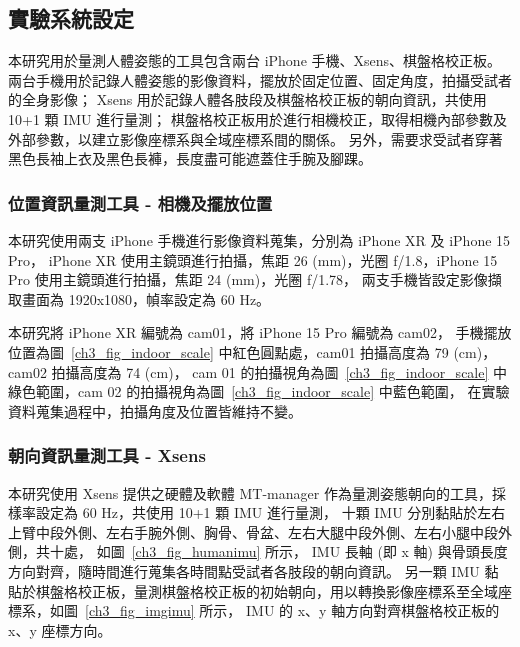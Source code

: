 
\subsection{實驗系統設定}
本研究用於量測人體姿態的工具包含兩台 iPhone 手機、Xsens、棋盤格校正板。
兩台手機用於記錄人體姿態的影像資料，擺放於固定位置、固定角度，拍攝受試者的全身影像；
Xsens 用於記錄人體各肢段及棋盤格校正板的朝向資訊，共使用 10+1 顆 IMU 進行量測；
棋盤格校正板用於進行相機校正，取得相機內部參數及外部參數，以建立影像座標系與全域座標系間的關係。
另外，需要求受試者穿著黑色長袖上衣及黑色長褲，長度盡可能遮蓋住手腕及腳踝。


\subsubsection{位置資訊量測工具 - 相機及擺放位置}
本研究使用兩支 iPhone 手機進行影像資料蒐集，分別為 iPhone XR 及 iPhone 15 Pro，
iPhone XR 使用主鏡頭進行拍攝，焦距 26 (mm)，光圈 ƒ/1.8，iPhone 15 Pro 使用主鏡頭進行拍攝，焦距 24 (mm)，光圈 ƒ/1.78，
兩支手機皆設定影像擷取畫面為 1920x1080，幀率設定為 60 Hz。

本研究將 iPhone XR 編號為 cam01，將 iPhone 15 Pro 編號為 cam02，
手機擺放位置為圖~\ref{ch3_fig_indoor_scale} 中紅色圓點處，cam01 拍攝高度為 79 (cm)，cam02 拍攝高度為 74 (cm)，
cam 01 的拍攝視角為圖~\ref{ch3_fig_indoor_scale} 中綠色範圍，cam 02 的拍攝視角為圖~\ref{ch3_fig_indoor_scale} 中藍色範圍，
在實驗資料蒐集過程中，拍攝角度及位置皆維持不變。

\subsubsection{朝向資訊量測工具 - Xsens}
本研究使用 Xsens 提供之硬體及軟體 MT-manager 作為量測姿態朝向的工具，採樣率設定為 60 Hz，共使用 10+1 顆 IMU 進行量測，
十顆 IMU 分別黏貼於左右上臂中段外側、左右手腕外側、胸骨、骨盆、左右大腿中段外側、左右小腿中段外側，共十處，
如圖~\ref{ch3_fig_humanimu} 所示， IMU 長軸 (即 x 軸) 與骨頭長度方向對齊，隨時間進行蒐集各時間點受試者各肢段的朝向資訊。
另一顆 IMU 黏貼於棋盤格校正板，量測棋盤格校正板的初始朝向，用以轉換影像座標系至全域座標系，如圖~\ref{ch3_fig_imgimu} 所示，
IMU 的 x、y 軸方向對齊棋盤格校正板的 x、y 座標方向。


